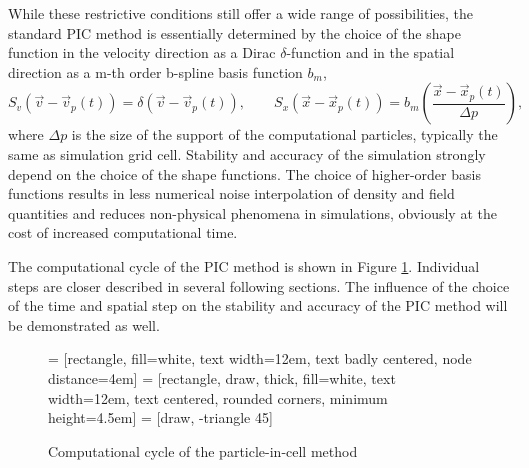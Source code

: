 While these restrictive conditions still offer a wide range of possibilities, the standard PIC method is essentially determined by the choice of the shape function in the velocity direction as a Dirac $ \delta $-function and in the spatial direction as a m-th order b-spline basis function $ b_{m} $,
\begin{equation}
\label{3.1.3}
S_{v}\left(\vec{v} - \vec{v}_{p}\left(t\right)\right) = \delta\left(\vec{v} - \vec{v}_{p}\left(t\right)\right), \qquad S_{x}\left(\vec{x} - \vec{x}_{p}\left(t\right)\right)  = b_{m}\left(\frac{\vec{x} - \vec{x}_{p}\left(t\right)}{\Delta p}\right),
\end{equation}
where $ \Delta p $ is the size of the support of the computational particles, typically the same as simulation grid cell. Stability and accuracy of the simulation strongly depend on the choice of the shape functions. The choice of higher-order basis functions results in less numerical noise interpolation of density and field quantities and reduces non-physical phenomena in simulations, obviously at the cost of increased computational time.

The computational cycle of the PIC method is shown in Figure \ref{3.1.4}. Individual steps are closer described in several following sections. The influence of the choice of the time and spatial step on the stability and accuracy of the PIC method will be demonstrated as well.

\begin{figure}[h!]
\centering
{} = [rectangle, fill=white, text width=12em, text badly centered, node distance=4em]
 = [rectangle, draw, thick, fill=white, text width=12em, text centered, rounded corners, minimum height=4.5em]
 = [draw, -triangle 45]
\caption{Computational cycle of the particle-in-cell method}
\label{3.1.4}
\end{figure}